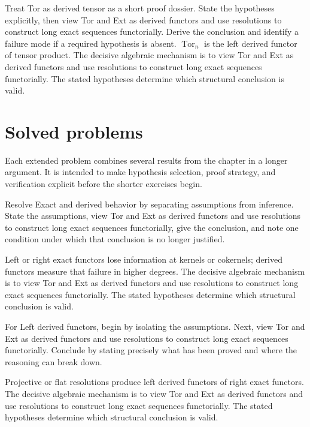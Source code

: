 \begin{example}\label{ex:v28-worked-04}
Treat Tor as derived tensor as a short proof dossier. State the hypotheses explicitly, then view Tor and Ext as derived functors and use resolutions to construct long exact sequences functorially. Derive the conclusion and identify a failure mode if a required hypothesis is absent. $\operatorname{Tor}_n$ is the left derived functor of tensor product. The decisive algebraic mechanism is to view Tor and Ext as derived functors and use resolutions to construct long exact sequences functorially. The stated hypotheses determine which structural conclusion is valid.
\end{example}

\section{Solved problems}
Each extended problem combines several results from the chapter in a longer argument. It is intended to make hypothesis selection, proof strategy, and verification explicit before the shorter exercises begin.

\begin{problem}\label{prob:v28-problem-01}
Resolve Exact and derived behavior by separating assumptions from inference. State the assumptions, view Tor and Ext as derived functors and use resolutions to construct long exact sequences functorially, give the conclusion, and note one condition under which that conclusion is no longer justified.
\end{problem}
\begin{solution}
Left or right exact functors lose information at kernels or cokernels; derived functors measure that failure in higher degrees. The decisive algebraic mechanism is to view Tor and Ext as derived functors and use resolutions to construct long exact sequences functorially. The stated hypotheses determine which structural conclusion is valid.
\end{solution}

\begin{problem}\label{prob:v28-problem-02}
For Left derived functors, begin by isolating the assumptions. Next, view Tor and Ext as derived functors and use resolutions to construct long exact sequences functorially. Conclude by stating precisely what has been proved and where the reasoning can break down.
\end{problem}
\begin{solution}
Projective or flat resolutions produce left derived functors of right exact functors. The decisive algebraic mechanism is to view Tor and Ext as derived functors and use resolutions to construct long exact sequences functorially. The stated hypotheses determine which structural conclusion is valid.
\end{solution}

